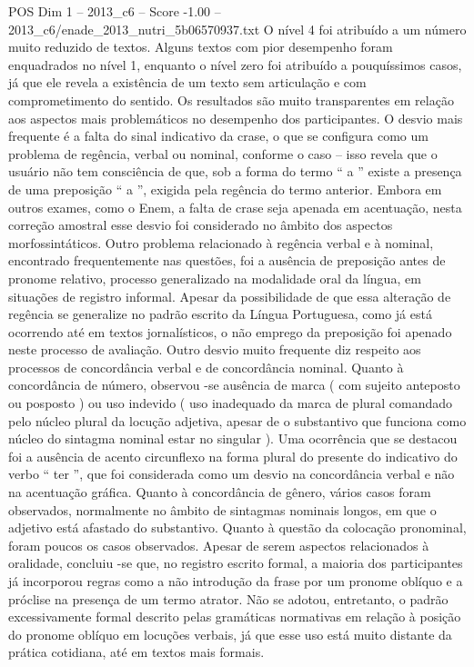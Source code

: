 \begin{textsample}{POS Dim 1 – 2013\_c6 – Score -1.00 – 2013\_c6/enade\_2013\_nutri\_5b06570937.txt}
O nível 4 foi atribuído a um número muito reduzido de textos.
Alguns textos com pior desempenho foram enquadrados no nível 1, enquanto o nível zero foi atribuído a pouquíssimos casos, já que ele revela a existência de um texto sem articulação e com comprometimento do sentido.
Os resultados são muito transparentes em relação aos aspectos mais problemáticos no desempenho dos participantes.
O desvio mais frequente é a falta do sinal indicativo da crase, o que se configura como um problema de regência, verbal ou nominal, conforme o caso – isso revela que o usuário não tem consciência de que, sob a forma do termo “ a ” existe a presença de uma preposição “ a ”, exigida pela regência do termo anterior.
Embora em outros exames, como o Enem, a falta de crase seja apenada em acentuação, nesta correção amostral esse desvio foi considerado no âmbito dos aspectos morfossintáticos.
Outro problema relacionado à regência verbal e à nominal, encontrado frequentemente nas questões, foi a ausência de preposição antes de pronome relativo, processo generalizado na modalidade oral da língua, em situações de registro informal.
Apesar da possibilidade de que essa alteração de regência se generalize no padrão escrito da Língua Portuguesa, como já está ocorrendo até em textos jornalísticos, o não emprego da preposição foi apenado neste processo de avaliação.
Outro desvio muito frequente diz respeito aos processos de concordância verbal e de concordância nominal.
Quanto à concordância de número, observou -se ausência de marca ( com sujeito anteposto ou posposto ) ou uso indevido ( uso inadequado da marca de plural comandado pelo núcleo plural da locução adjetiva, apesar de o substantivo que funciona como núcleo do sintagma nominal estar no singular ).
Uma ocorrência que se destacou foi a ausência de acento circunflexo na forma plural do presente do indicativo do verbo “ ter ”, que foi considerada como um desvio na concordância verbal e não na acentuação gráfica.
Quanto à concordância de gênero, vários casos foram observados, normalmente no âmbito de sintagmas nominais longos, em que o adjetivo está afastado do substantivo.
Quanto à questão da colocação pronominal, foram poucos os casos observados.
Apesar de serem aspectos relacionados à oralidade, concluiu -se que, no registro escrito formal, a maioria dos participantes já incorporou regras como a não introdução da frase por um pronome oblíquo e a próclise na presença de um termo atrator.
Não se adotou, entretanto, o padrão excessivamente formal descrito pelas gramáticas normativas em relação à posição do pronome oblíquo em locuções verbais, já que esse uso está muito distante da prática cotidiana, até em textos mais formais.

\end{textsample}
